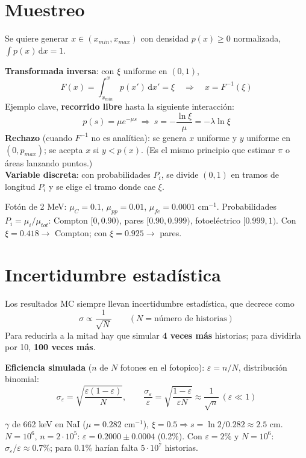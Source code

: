 \section{Muestreo}
Se quiere generar $x\in(x_{min},x_{max})$ con densidad $p(x)\ge0$ normalizada, $\int p(x)\,\mathrm{d}x=1$.
\begin{clave}
\textbf{Transformada inversa}: con $\xi$ uniforme en $(0,1)$,
\[ F(x)=\int_{x_{min}}^{x}p(x')\,\mathrm{d}x'=\xi\quad\Rightarrow\quad x=F^{-1}(\xi) \]
Ejemplo clave, \textbf{recorrido libre} hasta la siguiente interacción:
\[ p(s)=\mu e^{-\mu s}\ \Rightarrow\ s=-\frac{\ln\xi}{\mu}=-\lambda\ln\xi \]
\textbf{Rechazo} (cuando $F^{-1}$ no es analítica): se genera $x$ uniforme y $y$ uniforme en $(0,p_{max})$; se acepta $x$ si $y<p(x)$.
(Es el mismo principio que estimar $\pi$ o áreas lanzando puntos.)\\
\textbf{Variable discreta}: con probabilidades $P_i$, se divide $(0,1)$ en tramos de longitud $P_i$ y se elige el tramo donde cae $\xi$.
\end{clave}

\begin{ejemplo}
Fotón de 2 MeV: $\mu_C=0.1$, $\mu_{pp}=0.01$, $\mu_{fe}=0.0001$ cm$^{-1}$. Probabilidades $P_i=\mu_i/\mu_{tot}$:
Compton $[0,0.90)$, pares $[0.90,0.999)$, fotoeléctrico $[0.999,1)$. Con $\xi=0.418\to$ Compton; con $\xi=0.925\to$ pares.
\end{ejemplo}

\section{Incertidumbre estadística}
\begin{clave}
Los resultados MC siempre llevan incertidumbre estadística, que decrece como
\[ \sigma\propto\frac{1}{\sqrt N}\qquad(N=\text{número de historias}) \]
Para reducirla a la mitad hay que simular \textbf{4 veces más} historias; para dividirla por 10, \textbf{100 veces más}.

\textbf{Eficiencia simulada} ($n$ de $N$ fotones en el fotopico): $\varepsilon=n/N$, distribución binomial:
\[ \sigma_\varepsilon=\sqrt{\frac{\varepsilon(1-\varepsilon)}{N}},\qquad \frac{\sigma_\varepsilon}{\varepsilon}=\sqrt{\frac{1-\varepsilon}{\varepsilon N}}\approx\frac{1}{\sqrt n}\ (\varepsilon\ll1) \]
\end{clave}
\begin{ejemplo}
$\gamma$ de 662 keV en NaI ($\mu=0.282$ cm$^{-1}$), $\xi=0.5\Rightarrow s=\ln2/0.282\approx2.5$ cm.
$N=10^6$, $n=2\cdot10^5$: $\varepsilon=0.2000\pm0.0004$ (0.2\%). Con $\varepsilon=2\%$ y $N=10^6$: $\sigma_\varepsilon/\varepsilon\approx0.7\%$; para 0.1\% harían falta $5\cdot10^7$ historias.
\end{ejemplo}

